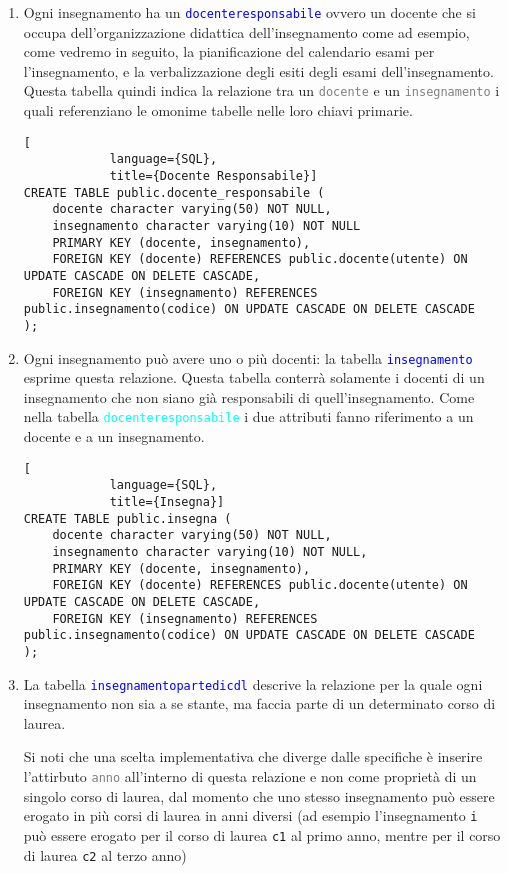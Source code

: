 \documentclass{article}
\newcommand{\tabb}[1]{\texttt{\textcolor{blue}{#1}}}
\newcommand{\tab}[1]{\texttt{\textcolor{cyan}{#1}}}
\newcommand{\attr}[1]{\texttt{\textcolor{gray}{#1}}}
\newcommand{\und}[0]{\textunderscore}
\newcommand{\alert}[0]{\textcolor{red}{\faExclamationCircle}}
\begin{document}
\begin{enumerate}
        \item Ogni insegnamento ha un \tabb{docente\und responsabile} ovvero un docente che si occupa dell'organizzazione didattica dell'insegnamento come ad esempio, come vedremo in seguito, la pianificazione del calendario esami per l'insegnamento, e la verbalizzazione degli esiti degli esami dell'insegnamento.
        Questa tabella quindi indica la relazione tra un \attr{docente} e un \attr{insegnamento} i quali referenziano le omonime tabelle nelle loro chiavi primarie.
        \begin{lstlisting}[
            language={SQL},
            title={Docente Responsabile}]
CREATE TABLE public.docente_responsabile (
    docente character varying(50) NOT NULL,
    insegnamento character varying(10) NOT NULL
    PRIMARY KEY (docente, insegnamento),
    FOREIGN KEY (docente) REFERENCES public.docente(utente) ON UPDATE CASCADE ON DELETE CASCADE,
    FOREIGN KEY (insegnamento) REFERENCES public.insegnamento(codice) ON UPDATE CASCADE ON DELETE CASCADE
);
        \end{lstlisting}

        \item Ogni insegnamento può avere uno o più docenti: la tabella \tabb{insegnamento} esprime questa relazione. Questa tabella conterrà solamente i docenti di un insegnamento che non siano già responsabili di quell'insegnamento. Come nella tabella \tab{docente\und responsabile} i due attributi fanno riferimento a un docente e a un insegnamento.
        \begin{lstlisting}[
            language={SQL},
            title={Insegna}]
CREATE TABLE public.insegna (
    docente character varying(50) NOT NULL,
    insegnamento character varying(10) NOT NULL,
    PRIMARY KEY (docente, insegnamento),
    FOREIGN KEY (docente) REFERENCES public.docente(utente) ON UPDATE CASCADE ON DELETE CASCADE,
    FOREIGN KEY (insegnamento) REFERENCES public.insegnamento(codice) ON UPDATE CASCADE ON DELETE CASCADE
);
        \end{lstlisting}

        \item La tabella \tabb{insegnamento\und parte\und di\und cdl} descrive la relazione per la quale ogni insegnamento non sia a se stante, ma faccia parte di un determinato corso di laurea.


        \alert Si noti che una scelta implementativa che diverge dalle specifiche è inserire l'attirbuto \attr{anno} all'interno di questa relazione e non come proprietà di un singolo corso di laurea, dal momento che uno stesso insegnamento può essere erogato in più corsi di laurea in anni diversi (ad esempio l'insegnamento \texttt{i} può essere erogato per il corso di laurea \texttt{c1} al primo anno, mentre per il corso di laurea \texttt{c2} al terzo anno)


\end{enumerate}
\end{document}
